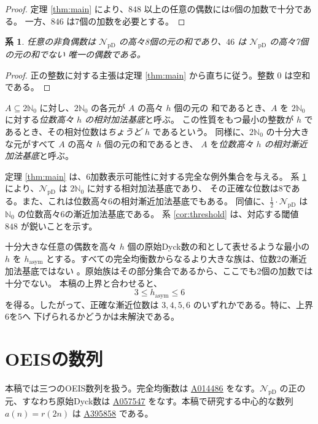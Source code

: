 \documentclass[12pt]{ltjsarticle}
\theoremstyle{plain}
\newtheorem{corollary}[theorem]{系}
\newcommand{\NpD}{\mathcal{N}_{\mathrm{pD}}}
\newcommand{\seqnum}[1]{\href{https://oeis.org/#1}{\rm \underline{#1}}}
\begin{document}
\begin{proof}
定理 \ref{thm:main} により、$848$ 以上の任意の偶数には6個の加数で十分である。
一方、$846$ は7個の加数を必要とする。
\end{proof}

\begin{corollary}\label{cor:eight}
任意の非負偶数は $\NpD$ の高々8個の元の和であり、$46$ は $\NpD$ の高々7個の元の和でない
唯一の偶数である。
\end{corollary}

\begin{proof}
正の整数に対する主張は定理 \ref{thm:main} から直ちに従う。整数 $0$ は空和である。
\end{proof}

$A\subseteq2\mathbb N_0$ に対し、$2\mathbb N_0$ の各元が $A$ の高々 $h$ 個の元の
和であるとき、$A$ を $2\mathbb N_0$ に対する\emph{位数高々 $h$ の相対加法基底}と呼ぶ。
この性質をもつ最小の整数が $h$ であるとき、その相対位数は\emph{ちょうど $h$} であるという。
同様に、$2\mathbb N_0$ の十分大きな元がすべて $A$ の高々 $h$ 個の元の和であるとき、
$A$ を\emph{位数高々 $h$ の相対漸近加法基底}と呼ぶ。

定理 \ref{thm:main} は、6加数表示可能性に対する完全な例外集合を与える。
系 \ref{cor:eight} により、$\NpD$ は $2\mathbb N_0$ に対する相対加法基底であり、
その正確な位数は8である。また、これは位数高々6の相対漸近加法基底でもある。
同値に、$\frac12\cdot\NpD$ は $\mathbb N_0$ の位数高々6の漸近加法基底である。
系 \ref{cor:threshold} は、対応する閾値 $848$ が鋭いことを示す。

十分大きな任意の偶数を高々 $h$ 個の原始Dyck数の和として表せるような最小の $h$ を
$h_{\mathrm{asym}}$ とする。すべての完全均衡数からなるより大きな族は、位数2の漸近加法基底ではない
\cite[Thm.~14]{BLS}。原始族はその部分集合であるから、ここでも2個の加数では十分でない。
本稿の上界と合わせると、
\[
        3\leq h_{\mathrm{asym}}\leq6
\]
を得る。したがって、正確な漸近位数は $3,4,5,6$ のいずれかである。特に、上界6を5へ
下げられるかどうかは未解決である。

\section{OEISの数列}\label{sec:oeis}

本稿では三つのOEIS数列を扱う。完全均衡数は \seqnum{A014486}
\cite{OEIS-A014486} をなす。$\NpD$ の正の元、すなわち原始Dyck数は
\seqnum{A057547} \cite{OEIS-A057547} をなす。本稿で研究する中心的な数列
$a(n)=r(2n)$ は \seqnum{A395858} \cite{OEIS-A395858} である。
\end{document}
